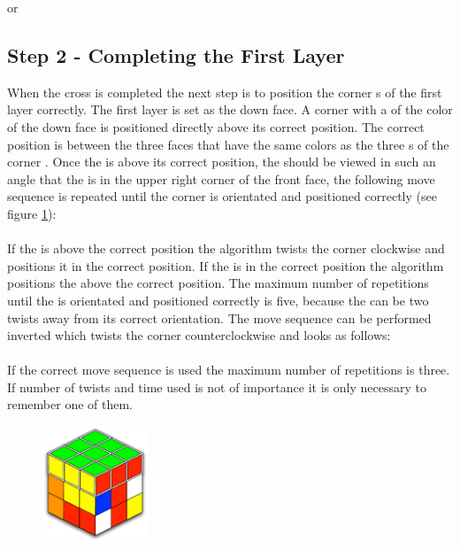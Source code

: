  or 

\subsection{Step 2 - Completing the First Layer}\label{sub:step2}
When the cross is completed the next step is to position the corner \cpiece{}s of the first layer correctly. The first layer is set as the down face. 
A corner with a \facet{} of the color of the down face is positioned directly above its correct  position. 
The correct position is between the three faces that have the same colors as the three \facet{}s of the corner \cpiece{}. 
Once the \cpiece{} is above its correct position, the \cube{} should be viewed in such an angle that the \cpiece{} is in the upper right corner of the front face, the following move sequence is repeated until the corner \cpiece{} is orientated and positioned correctly (see figure \ref{fig:2FL}): \\

 \\

If the \cpiece{} is above the correct position the algorithm twists the corner clockwise and positions it in the correct position. If the \cpiece{} is in the correct position the algorithm positions the \cpiece{} above the correct position. The maximum number of repetitions until the \cpiece{} is orientated and positioned correctly is five, because the \cpiece{} can be two twists away from its correct orientation. 
The move sequence can be performed inverted which twists the corner counterclockwise and looks as follows: \\

 \\

If the correct move sequence is used the maximum number of repetitions is three. If number of twists and time used is not of importance it is only necessary to remember one of them.

\begin{figure}
\begin{center}
	\includegraphics[width=0.28\textwidth]{input/pics/2FL.pdf}	
\end{center}
\caption{}
\label{fig:2FL}
\end{figure}

